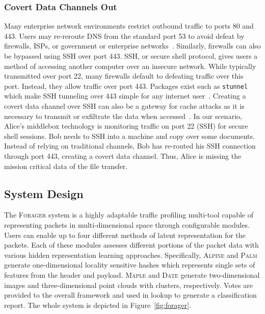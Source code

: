 \subsubsection{Covert Data Channels Out}
Many enterprise network environments restrict outbound traffic to ports 80 and 443. Users may re-reroute DNS from the standard port 53 to avoid defeat by firewalls, ISPs, or government or enterprise networks~\cite{shane-review-dns-over-http-04}. Similarly, firewalls can also be bypassed using SSH over port 443. SSH, or secure shell protocol, gives users a method of accessing another computer over an insecure network. While typically transmitted over port 22, many firewalls default to defeating traffic over this port. Instead, they allow traffic over port 443. Packages exist such as \texttt{stunnel} which make SSH tunneling over 443 simple for any internet user~\cite{wong2001stunnel}. Creating a covert data channel over SSH can also be a gateway for cache attacks as it is necessary to transmit or exfiltrate the data when accessed~\cite{Maurice2017HelloFT}. In our scenario, Alice's middlebox technology is monitoring traffic on port 22 (SSH) for secure shell sessions. Bob needs to SSH into a machine and copy over some documents. Instead of relying on traditional channels, Bob has re-routed his SSH connection through port 443, creating a covert data channel. Thus, Alice is missing the mission critical data of the file transfer.

\subsection{System Design}

The \textsc{Forager} system is a highly adaptable traffic profiling multi-tool capable of representing packets in multi-dimensional space through configurable modules. Users can enable up to four different methods of latent representation for the packets. Each of these modules assesses different portions of the packet data with various hidden representation learning approaches. Specifically, \textsc{Alpine} and \textsc{Palm}~\cite{kapoor2022deep} generate one-dimensional locality sensitive hashes which represents single sets of features from the header and payload. \textsc{Maple} and \textsc{Date} generate two-dimensional images and three-dimensional point clouds with clusters, respectively. Votes are provided to the overall framework and used in lookup to generate a classification report. The whole system is depicted in Figure~\ref{fig:forager}.

